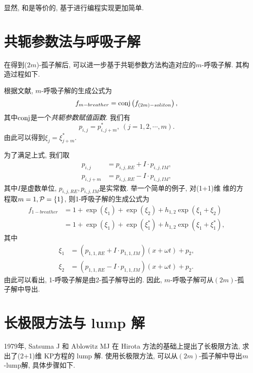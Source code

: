 显然, 和是等价的, 基于进行编程实现更加简单.

\section{共轭参数法与呼吸子解}
在得到($2m$)-孤子解后, 可以进一步基于共轭参数方法构造对应的$m$-呼吸子解. 其构造过程如下.

根据文献\cite{tajiri1989breather}, $m$-呼吸子解的生成公式为
\begin{equation}
    f_{m-breather}={\rm conj}\left(f_{(2m)-soliton}\right), \label{f-breather}
\end{equation}
其中${\rm conj}$是一个\emph{共轭参数赋值函数}. 我们有 
\begin{equation}
    p_{i,j}=p_{i,j+m}^*,~(j=1,2,\cdots,m).
\end{equation}
由此可以得到$\xi_{j}=\xi_{j+m}^*$. 

为了满足上式, 我们取
\begin{equation}
\begin{split}
    p_{i,j}&=p_{i,j,RE}+I\cdot p_{i,j,IM}, \\ 
    p_{i,j+m}&=p_{i,j,RE}-I\cdot p_{i,j,IM},
\end{split}
\end{equation}
其中$I$是虚数单位, $p_{i,j,RE},p_{i,j,IM}$是实常数. 举一个简单的例子, 对(1+1)维 维的方程取$m=1,\mathcal{P}=\left\{1\right\}$, 则1-呼吸子解的生成公式为
\begin{equation}
\begin{split}
f_{1-breather}&=1+\exp(\xi_1)+\exp(\xi_2)+h_{1,2}\exp(\xi_1+\xi_2) \\ 
&=1+\exp(\xi_1)+\exp(\xi_1^*)+h_{1,2}\exp(\xi_1+\xi_1^*),
\end{split}
\end{equation}
其中
\begin{equation}
\begin{split}
\xi_1&=(p_{1,1,RE}+I\cdot p_{1,1,IM})(x+\omega t)+p_{2}, \\ 
\xi_2&=(p_{1,1,RE}-I\cdot p_{1,1,IM})(x+\omega t)+p_{2}.
\end{split}    
\end{equation}
由此可以看出, 1-呼吸子解是由2-孤子解导出的. 因此, $m$-呼吸子解可从$(2m)$-孤子解中导出.

\section{长极限方法与 lump 解}
1979年, Satsuma J 和 Ablowitz MJ \cite{satsuma1979two} 在 Hirota 方法的基础上提出了长极限方法, 求出了(2+1)维 KP方程\cite{kadomtsev1970stability}的 lump 解. 使用长极限方法, 可以从$(2m)$-孤子解中导出$m$-lump解, 具体步骤如下.

